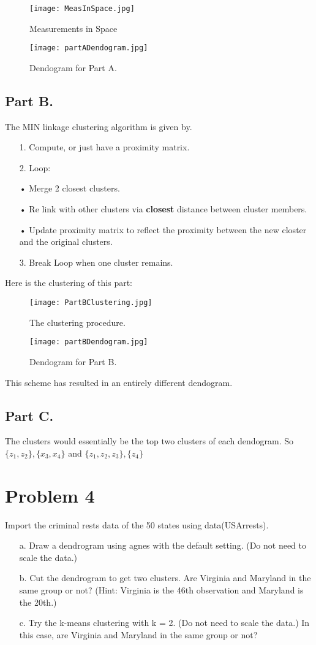 \documentclass{article}
\begin{document}
\begin{figure}[hbt!]
\centering
\texttt{[image: MeasInSpace.jpg]}
\caption{Measurements in Space}
\end{figure}
\begin{figure}[hbt!]
\centering
\texttt{[image: partADendogram.jpg]}
\caption{Dendogram for Part A.}
\end{figure}
\clearpage

\subsection*{Part B.}
The MIN linkage clustering algorithm is given by.
\begin{enumerate}
\item[1.] Compute, or just have a proximity matrix.
\item[2.] Loop:
\item[•] Merge 2 closest clusters.
\item[•] Re link with other clusters via \textbf{closest} distance between cluster members.
\item[•] Update proximity matrix to reflect the proximity between the new closter and the original clusters.
\item[3.] Break Loop when one cluster remains.
\end{enumerate}
Here is the clustering of this part:

\begin{figure}[hbt!]
\centering
\texttt{[image: PartBClustering.jpg]}
\caption{The clustering procedure.}
\end{figure}
\begin{figure}[hbt!]
\centering
\texttt{[image: partBDendogram.jpg]}
\caption{Dendogram for Part B.}
\end{figure}

This scheme has resulted in an entirely different dendogram.

\clearpage
\subsection*{Part C.}
The clusters would essentially be the top two clusters of each dendogram.
So $\{z_1,z_2 \},\{ x_3,x_4 \}$ and $\{z_1,z_2,z_3 \},\{ z_4 \}$


\section*{Problem 4}
Import the criminal rests data of the 50 states using data(USArrests).
\begin{enumerate}
\item[a.] Draw a dendrogram using agnes with the default setting. (Do not need to scale the data.)
\item[b.] Cut the dendrogram to get two clusters. Are Virginia and Maryland in the same group or not? (Hint: Virginia is the 46th observation and Maryland is the 20th.)
\item[c.] Try the k-means clustering with k = 2. (Do not need to scale the data.) In this case, are Virginia and Maryland in the same group or not?
\end{enumerate}
\end{document}
